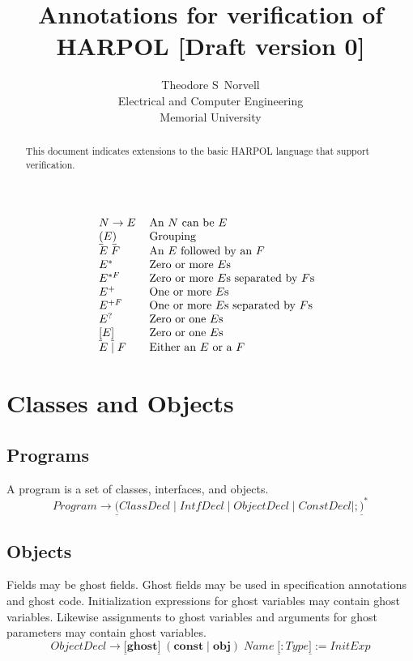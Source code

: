 \documentclass{article}%
\begin{document}
\title{Annotations for verification of HARPOL [Draft version 0]}
\author{Theodore S\ Norvell\\Electrical and Computer Engineering\\Memorial University}
\maketitle

\begin{abstract}
This document indicates extensions to the basic HARPOL language that support verification.

\end{abstract}

%

\[%
\begin{tabular}
[c]{ll}%
$N\rightarrow E$ & An $N$ can be $E$\\
$\underline{(}E\underline{)}$ & Grouping\\
$E\;F$ & An $E$ followed by an $F$\\
$E^{\ast}$ & Zero or more $E$s\\
$E^{\ast F}$ & Zero or more $E$s separated by $F$s\\
$E^{+}$ & One or more $E$s\\
$E^{+F}$ & One or more $E$s separated by $F$s\\
$E^{?}$ & Zero or one $E$s\\
$\underline{\lbrack}E\underline{]}$ & Zero or one $E$s\\
$E\mid F$ & Either an $E$ or a $F$%
\end{tabular}
\ \
\]


\section{Classes and Objects}

\subsection{Programs}

A program is a set of classes, interfaces, and objects.%
\[
Program\rightarrow\underline{(}ClassDecl\mid IntfDecl\mid ObjectDecl\mid
ConstDecl\mid;\underline{)}^{\ast}%
\]


\subsection{Objects}

Fields may be ghost fields. Ghost fields may be used in specification
annotations and ghost code. Initialization expressions for ghost variables may
contain ghost variables. Likewise assignments to ghost variables and arguments
for ghost parameters may contain ghost variables.%
\[
ObjectDecl\rightarrow\underline{[}\mathbf{ghost}\underline{]}\;(\mathbf{const}%
\mid\mathbf{obj})\;Name\;\underline{[}:Type\underline{]}:=InitExp
\]
\end{document}
